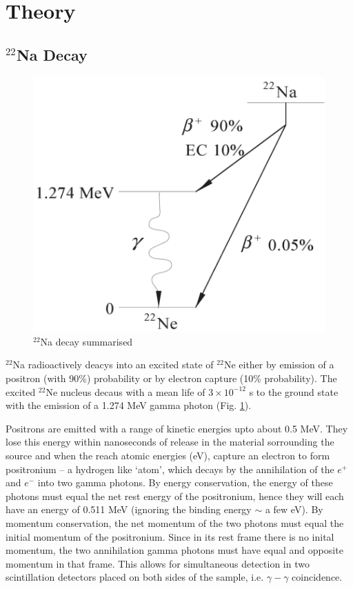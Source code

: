 \section{Theory}

\subsection{$^{22}$Na Decay}

\begin{figure}
    \centering
    \includegraphics[width=0.6\columnwidth]{images/expt.png}
    \caption{$^{22}$Na decay summarised}
    \label{expt}
\end{figure}

$^{22}$Na radioactively deacys into an excited state of 
$^{22}$Ne either by emission of a positron (with 90\%) probability or by electron capture (10\% probability). The excited $^{22}$Ne nucleus decaus with a mean life of $3\times 10^{-12}$ s to the ground state with the emission of a 1.274 MeV gamma photon (Fig. \ref{expt}).

Positrons are emitted with a range of kinetic energies upto about 0.5 MeV. They lose this energy within nanoseconds of release in the material sorrounding the source and when the reach atomic energies (eV), capture an electron to form positronium -- a hydrogen like `atom', which decays by the annihilation of the $e^+$ and $e^-$ into two gamma photons. By energy conservation, the energy of these photons must equal the net rest energy of the positronium, hence they will each have an energy of 0.511 MeV (ignoring the binding energy $\sim$ a few eV). By momentum conservation, the net momentum of the two photons must equal the initial momentum of the positronium. Since in its rest frame there is no inital momentum, the two annihilation gamma photons must have equal and opposite momentum in that frame. This allows for simultaneous detection in two scintillation detectors placed on both sides of the sample, i.e. $\gamma-\gamma$ coincidence.

